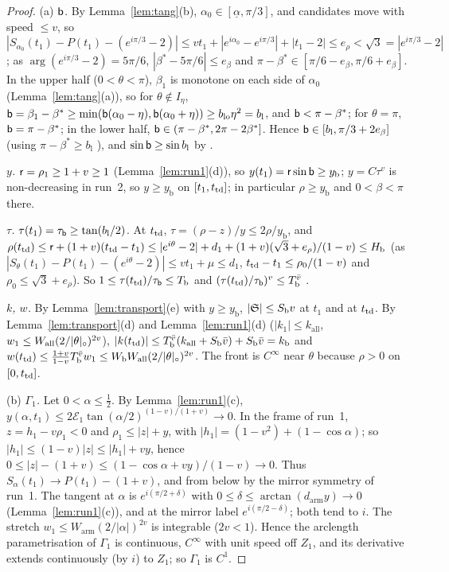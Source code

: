 \begin{proof}
(a) \emph{$\mathsf b$.} By Lemma~\ref{lem:tang}(b), $\alpha_0\in[\underline\alpha,\pi/3]$, and candidates move with speed $\le v$, so
$|S_{\alpha_0}(t_1)-P(t_1)-(e^{i\pi/3}-2)|\le vt_1+|e^{i\alpha_0}-e^{i\pi/3}|+|t_1-2|\le e_\rho<\sqrt3=|e^{i\pi/3}-2|$; as
$\arg(e^{i\pi/3}-2)=5\pi/6$, $|\beta^*-5\pi/6|\le e_\beta$ and $\pi-\beta^*\in[\pi/6-e_\beta,\pi/6+e_\beta]$. In the upper half
($0<\theta<\pi$), $\beta_1$ is monotone on each side of $\alpha_0$ (Lemma~\ref{lem:tang}(a)), so for $\theta\notin I_\eta$,
$\mathsf b=\beta_1-\beta^*\ge\min(\mathsf b(\alpha_0-\eta),\mathsf b(\alpha_0+\eta))\ge b_{\mathrm{lo}}\eta^2=b_{\mathrm l}$, and $\mathsf b<\pi-\beta^*$; for
$\theta=\pi$, $\mathsf b=\pi-\beta^*$; in the lower half, $\mathsf b\in(\pi-\beta^*,2\pi-2\beta^*]$. Hence $\mathsf b\in[b_{\mathrm l},\pi/3+2e_\beta]$
(using $\pi-\beta^*\ge b_{\mathrm l}$ ), and $\sin\mathsf b\ge\sin b_{\mathrm l}$ by .

\emph{$y$.} $\mathsf r=\rho_1\ge1+v\ge1$ (Lemma~\ref{lem:run1}(d)), so $y(t_1)=\mathsf r\sin\mathsf b\ge y_{\mathrm b}$; $y=C\tau^v$ is non-decreasing in
run~2, so $y\ge y_{\mathrm b}$ on $[t_1,t_{\mathrm{td}}]$; in particular $\rho\ge y_{\mathrm b}$ and $0<\beta<\pi$ there.

\emph{$\tau$.} $\tau(t_1)=\tau_{\mathsf b}\ge\tan(b_{\mathrm l}/2)$. At $t_{\mathrm{td}}$, $\tau=(\rho-z)/y\le2\rho/y_{\mathrm b}$, and
$\rho(t_{\mathrm{td}})\le\mathsf r+(1+v)(t_{\mathrm{td}}-t_1)\le|e^{i\theta}-2|+d_1+(1+v)(\sqrt3+e_\rho)/(1-v)\le H_{\mathrm b}$ (as $|S_\theta(t_1)-P(t_1)-(e^{i\theta}-2)|\le
vt_1+\mu\le d_1$, $t_{\mathrm{td}}-t_1\le\rho_0/(1-v)$ and $\rho_0\le\sqrt3+e_\rho$). So $1\le\tau(t_{\mathrm{td}})/\tau_{\mathsf b}\le T_{\mathrm b}$ and
$(\tau(t_{\mathrm{td}})/\tau_{\mathsf b})^v\le T_{\mathrm b}^{\bar v}$ .

\emph{$k$, $w$.} By Lemma~\ref{lem:transport}(e) with $y\ge y_{\mathrm b}$, $|\mathfrak S|\le S_{\mathrm b}v$ at $t_1$ and at $t_{\mathrm{td}}$. By
Lemma~\ref{lem:transport}(d) and Lemma~\ref{lem:run1}(d) ($|k_1|\le k_{\mathrm{all}}$, $w_1\le W_{\mathrm{all}}(2/|\theta|_\circ)^{2v}$),
$|k(t_{\mathrm{td}})|\le T_{\mathrm b}^{\bar v}(k_{\mathrm{all}}+S_{\mathrm b}\bar v)+S_{\mathrm b}\bar v=k_{\mathrm b}$ and
$w(t_{\mathrm{td}})\le\frac{1+v}{1-v}T_{\mathrm b}^{\bar v}w_1\le W_{\mathrm b}W_{\mathrm{all}}(2/|\theta|_\circ)^{2v}$. The front is $C^\infty$ near $\theta$
because $\rho>0$ on $[0,t_{\mathrm{td}}]$.

(b) \emph{$\Gamma_1$.} Let $0<\alpha\le\frac12$. By Lemma~\ref{lem:run1}(c), $y(\alpha,t_1)\le2\mathcal E_1\tan(\alpha/2)^{(1-v)/(1+v)}\to0$.
In the frame of run~1, $z=h_1-v\rho_1<0$ and $\rho_1\le|z|+y$, with $|h_1|=(1-v^2)+(1-\cos\alpha)$; so
$|h_1|\le(1-v)|z|\le|h_1|+vy$, hence $0\le|z|-(1+v)\le(1-\cos\alpha+vy)/(1-v)\to0$. Thus $S_\alpha(t_1)\to P(t_1)-(1+v)$, and
from below by the mirror symmetry of run~1. The tangent at $\alpha$ is $e^{i(\pi/2+\delta)}$ with $0\le\delta\le\arctan(d_{\mathrm{arm}}y)\to0$
(Lemma~\ref{lem:run1}(c)), and at the mirror label $e^{i(\pi/2-\delta)}$; both tend to $i$. The stretch $w_1\le W_{\mathrm{arm}}(2/|\alpha|)^{2v}$
is integrable ($2v<1$). Hence the arclength parametrisation of $\Gamma_1$ is continuous, $C^\infty$ with unit speed off $Z_1$, and its
derivative extends continuously (by $i$) to $Z_1$; so $\Gamma_1$ is $C^1$.


\end{proof}

